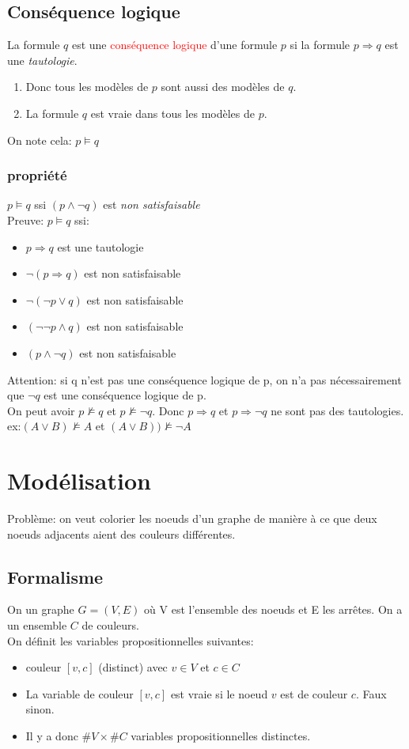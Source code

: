 \documentclass{report}
\begin{document}
\subsection{Conséquence logique}
La formule $q$ est une \textcolor{red}{conséquence logique} d'une formule $p$ si la formule $p \Rightarrow q$ est une \textit{tautologie}.\\
\begin{enumerate}
\item Donc tous les modèles de $p$ sont aussi des modèles de $q$.
\item La formule $q$ est vraie dans tous les modèles de $p$.
\end{enumerate}
On note cela: $p \models q$

\subsubsection{propriété}
\noindent
$p \models q$ ssi $(p \wedge \neg q)$ est \textit{non satisfaisable}\\
Preuve: $p \models q$ ssi:
\begin{itemize}
\item $p \Rightarrow q$ est une tautologie
\item $\neg( p \Rightarrow q)$ est non satisfaisable
\item $\neg(\neg p \vee q)$ est non satisfaisable
\item $(\neg \neg p \wedge q)$ est non satisfaisable
\item $( p \wedge \neg q)$ est non satisfaisable
\end{itemize}
Attention: si q n'est pas une conséquence logique de p, on n'a pas nécessairement que $\neg q$ est une conséquence logique de p.\\
On peut avoir $p \nvDash q$ et $p \nvDash \neg q$. Donc $p \Rightarrow q$ et $p \Rightarrow \neg q$ ne sont pas des tautologies. ex:$(A \vee B) \nvDash A$ et $(A \vee B)) \nvDash \neg A$

\section{Modélisation}
Problème: on veut colorier les noeuds d'un graphe de manière à ce que deux noeuds adjacents aient des couleurs différentes.
\subsection{Formalisme}
On un graphe $G=(V,E)$ où V est l'ensemble des noeuds et E les arrêtes. On a un ensemble $C$ de couleurs.\\
On définit les variables propositionnelles suivantes:
\begin{itemize}
\item couleur $[v,c]$ (distinct) avec $v \in V$ et $c \in C$
\item La variable de couleur $[v,c]$ est vraie si le noeud $v$ est de couleur $c$. Faux sinon.
\item Il y a donc $\# V \times \# C$ variables propositionnelles distinctes.
\end{itemize}
\end{document}
